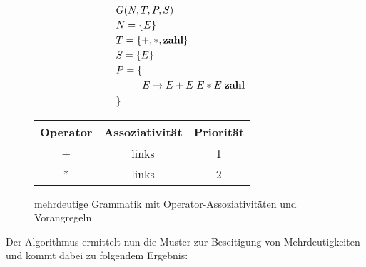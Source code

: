 \documentclass[runningheads]{llncs}
\begin{document}
    \begin{figure}
        \begin{minipage}{0.48\textwidth}
            \begin{flushleft}
                \begin{align*}
                    & G(N,T,P,S) \\
                    & N = \{E\} \\
                    & T = \{+, *, \bold{zahl}\} \\
                    & S = \{E\} \\
                    & P = \{ \begin{aligned}[t]
                                 \\ E & \rightarrow E + E | E * E | \bold{zahl}
                    \end{aligned} \\
                    & \}
                \end{align*}
            \end{flushleft}
        \end{minipage}
        \hfill
        \begin{minipage}{0.48\textwidth}
            \begin{tabular}{|c|c|c|}
                \hline
                Operator & Assoziativität & Priorität \\
                \hline
                +        & links          & 1         \\
                *        & links          & 2         \\
                \hline
            \end{tabular}
        \end{minipage}
        \caption{mehrdeutige Grammatik mit Operator-Assoziativitäten und Vorangregeln}
        \label{fig:figure7}
    \end{figure}

    Der Algorithmus ermittelt nun die Muster zur Beseitigung von Mehrdeutigkeiten und kommt dabei zu folgendem Ergebnis:
\end{document}
